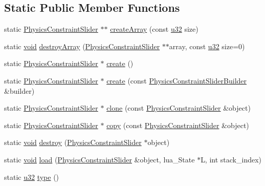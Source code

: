 \subsection*{Static Public Member Functions}
\begin{DoxyCompactItemize}
\item 
static \mbox{\hyperlink{classnjli_1_1_physics_constraint_slider}{Physics\+Constraint\+Slider}} $\ast$$\ast$ \mbox{\hyperlink{classnjli_1_1_physics_constraint_slider_a450adff89ca4821c15d5b5e038261e94}{create\+Array}} (const \mbox{\hyperlink{_util_8h_a10e94b422ef0c20dcdec20d31a1f5049}{u32}} size)
\item 
static \mbox{\hyperlink{_thread_8h_af1e856da2e658414cb2456cb6f7ebc66}{void}} \mbox{\hyperlink{classnjli_1_1_physics_constraint_slider_a293103ad00ee8f7fd7d2ddc6ba82e56b}{destroy\+Array}} (\mbox{\hyperlink{classnjli_1_1_physics_constraint_slider}{Physics\+Constraint\+Slider}} $\ast$$\ast$array, const \mbox{\hyperlink{_util_8h_a10e94b422ef0c20dcdec20d31a1f5049}{u32}} size=0)
\item 
static \mbox{\hyperlink{classnjli_1_1_physics_constraint_slider}{Physics\+Constraint\+Slider}} $\ast$ \mbox{\hyperlink{classnjli_1_1_physics_constraint_slider_a020eb232400507347e4e7fe41e4ae572}{create}} ()
\item 
static \mbox{\hyperlink{classnjli_1_1_physics_constraint_slider}{Physics\+Constraint\+Slider}} $\ast$ \mbox{\hyperlink{classnjli_1_1_physics_constraint_slider_a154d2e4acbf2c4a568ed6f95bb5897e9}{create}} (const \mbox{\hyperlink{classnjli_1_1_physics_constraint_slider_builder}{Physics\+Constraint\+Slider\+Builder}} \&builder)
\item 
static \mbox{\hyperlink{classnjli_1_1_physics_constraint_slider}{Physics\+Constraint\+Slider}} $\ast$ \mbox{\hyperlink{classnjli_1_1_physics_constraint_slider_a40db75b41a6eaac15127312ab15a8d04}{clone}} (const \mbox{\hyperlink{classnjli_1_1_physics_constraint_slider}{Physics\+Constraint\+Slider}} \&object)
\item 
static \mbox{\hyperlink{classnjli_1_1_physics_constraint_slider}{Physics\+Constraint\+Slider}} $\ast$ \mbox{\hyperlink{classnjli_1_1_physics_constraint_slider_acb1f1dffeec353b98d5edf9597b42a58}{copy}} (const \mbox{\hyperlink{classnjli_1_1_physics_constraint_slider}{Physics\+Constraint\+Slider}} \&object)
\item 
static \mbox{\hyperlink{_thread_8h_af1e856da2e658414cb2456cb6f7ebc66}{void}} \mbox{\hyperlink{classnjli_1_1_physics_constraint_slider_ac746bf16e379f1142f987816d8b8fab2}{destroy}} (\mbox{\hyperlink{classnjli_1_1_physics_constraint_slider}{Physics\+Constraint\+Slider}} $\ast$object)
\item 
static \mbox{\hyperlink{_thread_8h_af1e856da2e658414cb2456cb6f7ebc66}{void}} \mbox{\hyperlink{classnjli_1_1_physics_constraint_slider_a7fcf7e1b1ba501fbe1429e17db845e59}{load}} (\mbox{\hyperlink{classnjli_1_1_physics_constraint_slider}{Physics\+Constraint\+Slider}} \&object, lua\+\_\+\+State $\ast$L, int stack\+\_\+index)
\item 
static \mbox{\hyperlink{_util_8h_a10e94b422ef0c20dcdec20d31a1f5049}{u32}} \mbox{\hyperlink{classnjli_1_1_physics_constraint_slider_a583e96bac901b7464d7cf2272a2d57f8}{type}} ()
\end{DoxyCompactItemize}
